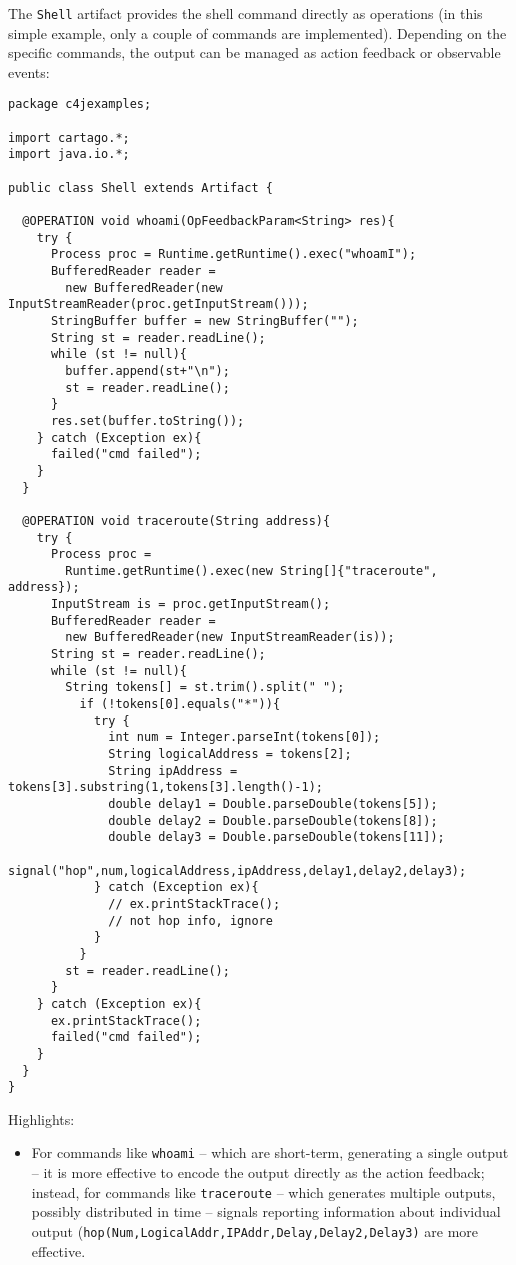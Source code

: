 \documentclass[11pt]{report}
\newcommand\code[1]{{\small{\mbox{\texttt{{#1}}}}}}
\begin{document}
The \code{Shell} artifact provides the shell command directly  as operations (in this simple example, only a couple of commands are implemented).
%
Depending on the specific commands, the output can be managed  as action feedback or observable events:
{\small{\begin{verbatim}
package c4jexamples;

import cartago.*;
import java.io.*;

public class Shell extends Artifact {

  @OPERATION void whoami(OpFeedbackParam<String> res){
    try {
      Process proc = Runtime.getRuntime().exec("whoamI");
      BufferedReader reader = 
        new BufferedReader(new InputStreamReader(proc.getInputStream()));
      StringBuffer buffer = new StringBuffer("");
      String st = reader.readLine();
      while (st != null){
        buffer.append(st+"\n");
        st = reader.readLine();
      }
      res.set(buffer.toString());
    } catch (Exception ex){
      failed("cmd failed");
    }
  }
  
  @OPERATION void traceroute(String address){
    try {
      Process proc = 
        Runtime.getRuntime().exec(new String[]{"traceroute", address});
      InputStream is = proc.getInputStream();
      BufferedReader reader = 
        new BufferedReader(new InputStreamReader(is));
      String st = reader.readLine();
      while (st != null){
        String tokens[] = st.trim().split(" ");
          if (!tokens[0].equals("*")){
            try {
              int num = Integer.parseInt(tokens[0]);
              String logicalAddress = tokens[2];
              String ipAddress = tokens[3].substring(1,tokens[3].length()-1);
              double delay1 = Double.parseDouble(tokens[5]);
              double delay2 = Double.parseDouble(tokens[8]);
              double delay3 = Double.parseDouble(tokens[11]);
              signal("hop",num,logicalAddress,ipAddress,delay1,delay2,delay3);
            } catch (Exception ex){
              // ex.printStackTrace();
              // not hop info, ignore
            }
          }
        st = reader.readLine();
      }
    } catch (Exception ex){
      ex.printStackTrace();
      failed("cmd failed");
    }
  } 
}
\end{verbatim}}}
%
\noindent Highlights:
%
\begin{itemize}
%
\item For commands like \code{whoami} -- which are short-term, generating a single output -- it is more effective to encode the output directly as the action feedback; 
%
instead, for commands like \code{traceroute} -- which generates multiple outputs, possibly distributed in time -- signals reporting information about individual output (\code{hop(Num,LogicalAddr,IPAddr,Delay,Delay2,Delay3)} are more effective. 
%
\end{itemize} 
\end{document}
